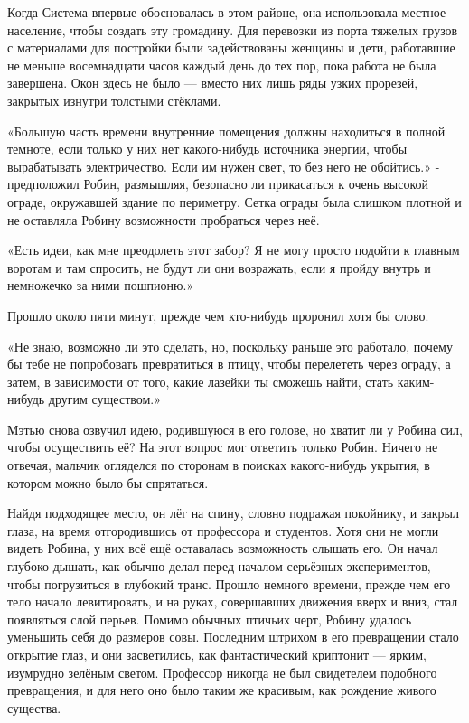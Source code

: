 \documentclass[a4paper,12pt]{book}
\begin{document}
\par
Когда Система впервые обосновалась в этом районе, она использовала местное население, чтобы создать эту громадину. Для перевозки из порта тяжелых грузов с материалами для постройки были задействованы женщины и дети, работавшие не меньше восемнадцати часов каждый день до тех пор, пока работа не была завершена. Окон здесь не было — вместо них лишь ряды узких прорезей, закрытых изнутри толстыми стёклами.
\par
«Большую часть времени внутренние помещения должны находиться в полной темноте, если только у них нет какого-нибудь источника энергии, чтобы вырабатывать электричество. Если им нужен свет, то без него не обойтись.» - предположил Робин, размышляя, безопасно ли прикасаться к очень высокой ограде, окружавшей здание по периметру. Сетка ограды была слишком плотной и не оставляла Робину возможности пробраться через неё.
\par
«Есть идеи, как мне преодолеть этот забор? Я не могу просто подойти к главным воротам и там спросить, не будут ли они возражать, если я пройду внутрь и немножечко за ними пошпионю.»\\
\par
Прошло около пяти минут, прежде чем кто-нибудь проронил хотя бы слово.\\
\par
«Не знаю, возможно ли это сделать, но, поскольку раньше это работало, почему бы тебе не попробовать превратиться в птицу, чтобы перелететь через ограду, а затем, в зависимости от того, какие лазейки ты сможешь найти, стать каким-нибудь другим существом.»
\par
Мэтью снова озвучил идею, родившуюся в его голове, но хватит ли у Робина сил, чтобы осуществить её? На этот вопрос мог ответить только Робин. Ничего не отвечая, мальчик огляделся по сторонам в поисках какого-нибудь укрытия, в котором можно было бы спрятаться.
\par
Найдя подходящее место, он лёг на спину, словно подражая покойнику, и закрыл глаза, на время отгородившись от профессора и студентов. Хотя они не могли видеть Робина, у них всё ещё оставалась возможность слышать его. Он начал глубоко дышать, как обычно делал перед началом серьёзных экспериментов, чтобы погрузиться в глубокий транс. Прошло немного времени, прежде чем его тело начало левитировать, и на руках, совершавших движения вверх и вниз, стал появляться слой перьев. Помимо обычных птичьих черт, Робину удалось уменьшить себя до размеров совы. Последним штрихом в его превращении стало открытие глаз, и они засветились, как фантастический криптонит — ярким, изумрудно зелёным светом. Профессор никогда не был свидетелем подобного превращения, и для него оно было таким же красивым, как рождение живого существа.\\
\end{document}
